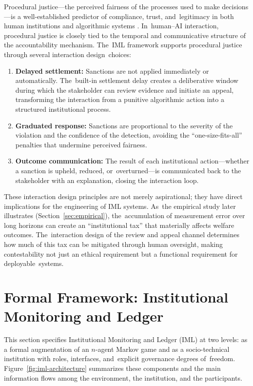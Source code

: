 \documentclass[mca,article,accept,pdftex,oneauthor]{Definitions/mdpi}
\begin{document}
Procedural justice---the perceived fairness of the processes used to make decisions---is a well-established predictor of compliance, trust, and~legitimacy in both human institutions and algorithmic systems \citep{Tyler1990,Lee2019ProceduralJustice}. In~human--AI interaction, procedural justice is closely tied to the temporal and communicative structure of the accountability mechanism. The~IML framework supports procedural justice through several interaction design~choices:
\begin{enumerate}
    \item \textbf{Delayed settlement:} Sanctions are not applied immediately or automatically. The~built-in settlement delay creates a deliberative window during which the stakeholder can review evidence and initiate an appeal, transforming the interaction from a punitive algorithmic action into a structured institutional process.
    \item \textbf{Graduated response:} Sanctions are proportional to the severity of the violation and the confidence of the detection, avoiding the ``one-size-fits-all'' penalties that undermine perceived fairness.
    \item \textbf{Outcome communication:} The result of each institutional action---whether a sanction is upheld, reduced, or~overturned---is communicated back to the stakeholder with an explanation, closing the interaction loop.
\end{enumerate}

These interaction design principles are not merely aspirational; they have direct implications for the engineering of IML systems. As~the empirical study later illustrates (Section~\ref{sec:empirical}), the~accumulation of measurement error over long horizons can create an ``institutional tax'' that materially affects welfare outcomes. The~interaction design of the review and appeal channel determines how much of this tax can be mitigated through human oversight, making contestability not just an ethical requirement but a functional requirement for deployable~systems.

\section{Formal Framework: Institutional Monitoring and Ledger}
\label{sec:iml}

This section specifies Institutional Monitoring and Ledger (IML) at two levels: as a formal augmentation of an $n$-agent Markov game and as a socio-technical institution with roles, interfaces, and~explicit governance degrees of~freedom. Figure~\ref{fig:iml-architecture} summarizes these components and the main information flows among the environment, the institution, and the participants. 
\end{document}

